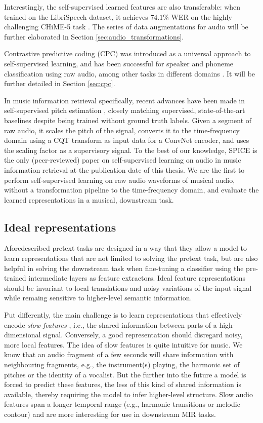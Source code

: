 Interestingly, the self-supervised learned features are also transferable: when trained on the LibriSpeech dataset, it achieves $74.1\%$ WER on the highly challenging CHiME-5 task \cite{barker2018fifth}.
The series of data augmentations for audio will be further elaborated in Section \ref{sec:audio_transformations}.

Contrastive predictive coding (CPC) was introduced as a universal approach to self-supervised learning, and has been successful for speaker and phoneme classification using raw audio, among other tasks in different domains \cite{oord_representation_2019}.
It will be further detailed in Section \ref{sec:cpc}.

In music information retrieval specifically, recent advances have been made in self-supervised pitch estimation \cite{spice}, closely matching supervised, state-of-the-art baselines despite being trained without ground truth labels.
Given a segment of raw audio, it scales the pitch of the signal, converts it to the time-frequency domain using a CQT transform as input data for a ConvNet encoder, and uses the scaling factor as a supervisory signal.
To the best of our knowledge, SPICE\cite{spice} is the only (peer-reviewed) paper on self-supervised learning on audio in music information retrieval at the publication date of this thesis. We are the first to perform self-supervised learning on raw audio waveforms of musical audio, without a transformation pipeline to the time-frequency domain, and evaluate the learned representations in a musical, downstream task.

\subsection{Ideal representations}
Aforedescribed pretext tasks are designed in a way that they allow a model to learn representations that are not limited to solving the pretext task, but are also helpful in solving the downstream task when fine-tuning a classifier using the pre-trained intermediate layers as feature extractors.
Ideal feature representations should be invariant to local translations and noisy variations of the input signal while remaing sensitive to higher-level semantic information.

Put differently, the main challenge is to learn representations that effectively encode \textit{slow features} \cite{wiskott_slow_2002}, i.e., the shared information between parts of a high-dimensional signal.
Conversely, a good representation should disregard noisy, more local features.
The idea of slow features is quite intuitive for music.
We know that an audio fragment of a few seconds will share information with neighbouring fragments, e.g., the instrument(s) playing, the harmonic set of pitches or the identity of a vocalist.
 But the further into the future a model is forced to predict these features, the less of this kind of shared information is available, thereby requiring the model to infer higher-level structure.
Slow audio features span a longer temporal range (e.g., harmonic transitions or melodic contour) and are more interesting for use in downstream MIR tasks.


